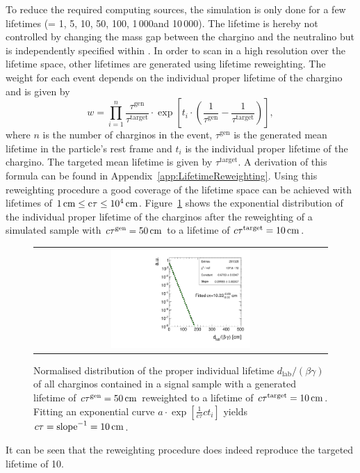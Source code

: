To reduce the required computing sources, the simulation is only done for a few lifetimes (\ctau = 1\cm, 5\cm, 10\cm, 50\cm, 100\cm, 1\,000\cm and 10\,000\cm).
The lifetime is hereby not controlled by changing the mass gap between the chargino and the neutralino but is independently specified within \geant.
In order to scan in a high resolution over the lifetime space, other lifetimes are generated using lifetime reweighting.
The weight for each event depends on the individual proper lifetime of the chargino and is given by
\begin{equation}
w = \prod_{i=1}^n \frac{\tau^{\text{gen}}}{\tau^{\text{target}}}\cdot  \exp \left[ t_i \cdot \left( \frac{1}{\tau^{\text{gen}}} - \frac{1}{\tau^{\text{target}}} \right) \right] ,
\end{equation}
where $n$ is the  number of charginos in the event, $\tau^{\text{gen}}$ is the generated mean lifetime in the particle's rest frame and $t_i$ is the individual proper lifetime of the chargino. 
The targeted mean lifetime is given by $\tau^{\text{target}}$. 
A derivation of this formula can be found in Appendix~\ref{app:LifetimeReweighting}.
Using this reweighting procedure a good coverage of the lifetime space can be achieved with lifetimes of $1\,\text{cm} \leq \text{c}\tau \leq 10^4 \,\text{cm} $. %
Figure~\ref{fig:LifetimeReweighting} shows the exponential distribution of the individual proper lifetime of the charginos after the reweighting of a simulated sample with $c\tau^{\text{gen}}=50\,\text{cm}$ to a lifetime of $c\tau^{\text{target}}=10\,\text{cm}$.
\begin{figure}[!b]
  \centering 
  \begin{tabular}{c}
    \includegraphics[width=0.49\textwidth]{figures/analysis_2/10cm.pdf}
  \end{tabular}
  \caption{Normalised distribution of the proper individual lifetime $d_{\text{lab}}/\left(\beta\gamma \right)$ of all charginos contained in a signal sample with a generated lifetime of $c\tau^{\text{gen}}=50\,\text{cm}$ reweighted to a lifetime of $c\tau^{\text{target}}=10\,\text{cm}$. Fitting an exponential curve $a\cdot \exp\left[\frac{1}{c \tau } c t_i\right]$ yields $c\tau=\text{slope}^{-1}=10\,\text{cm}$.}
  \label{fig:LifetimeReweighting}
\end{figure}
It can be seen that the reweighting procedure does indeed reproduce the targeted lifetime of 10\cm.


